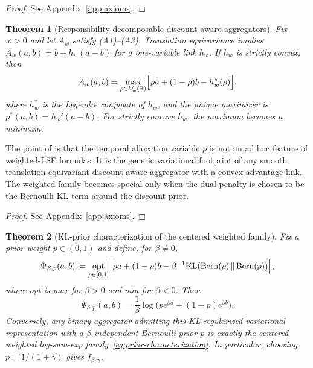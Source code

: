 \documentclass{article}
\newtheorem{theorem}{Theorem}[section]
\theoremstyle{remark}
\DeclareMathOperator{\Bern}{Bern}
\newcommand{\R}{\mathbb{R}}
\newcommand{\KL}{\mathrm{KL}}
\newcommand{\defeq}{\coloneqq}
\newcommand{\KLbin}[2]{\KL\!\left(\Bern(#1)\,\middle\|\,\Bern(#2)\right)}
\begin{document}
\begin{proof}
See Appendix~\ref{app:axioms}.
\end{proof}

\begin{theorem}[Responsibility-decomposable discount-aware aggregators]
\label{thm:broad-class}
Fix $w>0$ and let $A_w$ satisfy \textnormal{(A1)--(A3)}.
Translation equivariance implies $A_w(a,b)=b+h_w(a-b)$ for a one-variable link $h_w$.
If $h_w$ is strictly convex, then
\begin{equation}
A_w(a,b)
=
\max_{\rho\in h_w'(\R)}
\Bigl[\rho a +(1-\rho)b-h_w^*(\rho)\Bigr],
\label{eq:broad-decomp}
\end{equation}
where $h_w^*$ is the Legendre conjugate of $h_w$, and the unique maximizer is $\rho^*(a,b)=h_w'(a-b)$.
For strictly concave $h_w$, the maximum becomes a minimum.
\end{theorem}

The point of  is that the temporal allocation variable $\rho$ is not an ad hoc feature of weighted-LSE formulas.
It is the generic variational footprint of any smooth translation-equivariant discount-aware aggregator with a convex advantage link.
The weighted family becomes special only when the dual penalty is chosen to be the Bernoulli KL term around the discount prior.

\begin{proof}
See Appendix~\ref{app:axioms}.
\end{proof}

\begin{theorem}[KL-prior characterization of the centered weighted family]
\label{thm:prior-characterization}
Fix a prior weight $p\in(0,1)$ and define, for $\beta\neq 0$,
\[
\Psi_{\beta,p}(a,b)
\defeq
\underset{\rho\in[0,1]}{\mathrm{opt}}
\Bigl[\rho a +(1-\rho)b - \beta^{-1}\KLbin{\rho}{p}\Bigr],
\]
where \textnormal{opt} is \textnormal{max} for $\beta>0$ and \textnormal{min} for $\beta<0$.
Then
\begin{equation}
\Psi_{\beta,p}(a,b)=\frac{1}{\beta}\log\bigl(p e^{\beta a}+(1-p)e^{\beta b}\bigr).
\label{eq:prior-characterization}
\end{equation}
Conversely, any binary aggregator admitting this KL-regularized variational representation with a $\beta$-independent Bernoulli prior $p$ is exactly the centered weighted log-sum-exp family~\eqref{eq:prior-characterization}.
In particular, choosing $p=1/(1+\gamma)$ gives $f_{\beta,\gamma}$.
\end{theorem}
\end{document}
